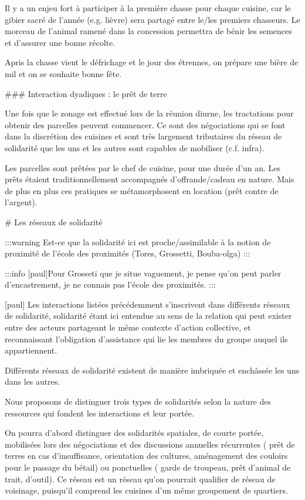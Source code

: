 Il y a un enjeu fort à participer à la première chasse pour chaque cuisine, car le gibier sacré de l'année (e.g. lièvre) sera partagé entre le/les premiers chasseurs. Le morceau de l'animal ramené dans la concession permettra de bénir les semences et d'assurer une bonne récolte.

Apris la chasse vient le défrichage  et  le jour des étrennes, on prépare une bière de mil et on se souhaite bonne fête.


### Interaction dyadiques : le prêt de terre 

Une fois que le zonage est effectué lors de la réunion diurne, les tractations pour obtenir des parcelles  peuvent commencer. Ce sont des négociations qui se font dans la discrétion des cuisines et sont très largement tributaires du réseau de solidarité que les uns et les autres sont capables de mobiliser (c.f. infra).

Les parcelles sont prêtées par le chef de cuisine, pour une durée d'un an. Les prêts étaient traditionnellement accompagnés d'offrande/cadeau en nature. Mais de plus en plus ces pratiques se métamorphosent en location (prêt contre de l'argent).

# Les réseaux de solidarité

:::warning
Est-ce que la solidarité ici est proche/assimilable à la notion de proximité de l'école des proximités (Tores, Grossetti, Bouba-olga)
:::

:::info
[paul]Pour Grosseti que je situe vaguement, je pense qu'on peut parler d'encastrement, je ne connais pas l'école des proximités.
:::

[paul] Les interactions listées précédemment s'inscrivent dans différents réseaux de solidarité, solidarité étant ici entendue au sens de la relation qui peut exister entre des acteurs partageant le même contexte d'action collective, et reconnaissant l'obligation d'assistance qui lie les membres du groupe auquel ils appartiennent.


Différents réseaux de solidarité existent de manière imbriquée et enchâssée les uns dans les autres. 

Nous proposons de distinguer trois types de solidarités selon la nature des ressources qui fondent les interactions et leur portée.

On pourra d'abord distinguer des solidarités spatiales, de courte portée,  mobilisées lors des négociations et des discussions annuelles récurrentes ( prêt de terres en cas d'insuffisance, orientation des cultures, aménagement des couloirs pour le passage du bétail) ou ponctuelles ( garde de troupeau, prêt d'animal de trait, d'outil). 
Ce réseau est un réseau qu'on pourrait qualifier de réseau de  voisinage, puisqu'il comprend les cuisines d'un même groupement de quartiers. 


